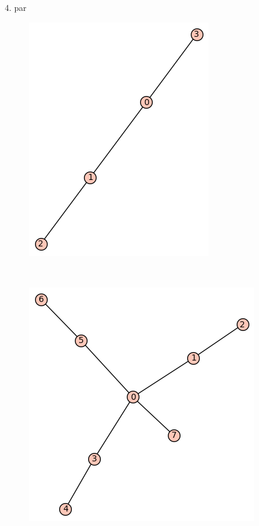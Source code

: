 \documentclass[12pt, a4paper]{article}
\begin{document}
4. par

\begin{figure}[h!]
\centering
\includegraphics[width=\linewidth]{t-3}
\end{figure} \\

\begin{figure}[h!]
\centering
\includegraphics[width=\linewidth]{t-44}
\end{figure} \\
\end{document}
